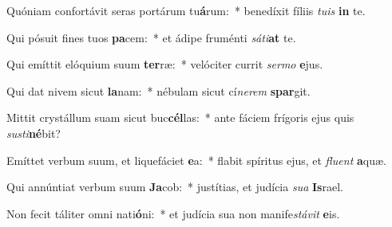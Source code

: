 \item Quóniam confortávit seras portárum tu\textbf{á}rum:~* benedíxit fíliis \textit{tuis} \textbf{in} te.
\item Qui pósuit fines tuos \textbf{pa}cem:~* et ádipe fruménti \textit{sáti}\textbf{at} te.
\item Qui emíttit elóquium suum \textbf{ter}ræ:~* velóciter currit \textit{sermo} \textbf{e}jus.
\item Qui dat nivem sicut \textbf{la}nam:~* nébulam sicut cí\textit{nerem} \textbf{spar}git.
\item Mittit crystállum suam sicut buc\textbf{cél}las:~* ante fáciem frígoris ejus quis \textit{susti}\textbf{né}bit?
\item Emíttet verbum suum, et liquefáciet \textbf{e}a:~* flabit spíritus ejus, et \textit{fluent} \textbf{a}quæ.
\item Qui annúntiat verbum suum \textbf{Ja}cob:~* justítias, et judícia \textit{sua} \textbf{Is}rael.
\item Non fecit táliter omni nati\textbf{ó}ni:~* et judícia sua non manife\hspace{0.02em}\textit{stávit} \textbf{e}is.
